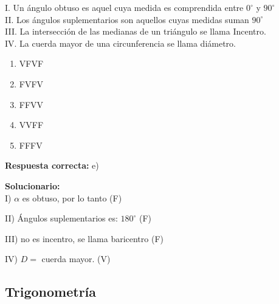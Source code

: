 \begin{enumerate}
	I. Un ángulo obtuso es aquel cuya medida es comprendida entre $0^\circ$ y $90^\circ$\\
	II. Los ángulos suplementarios son aquellos cuyas medidas suman $90^\circ$\\
	III. La intersección de las medianas de un triángulo se llama Incentro.\\
	IV. La cuerda mayor de una circunferencia se llama diámetro.
	
	\begin{enumerate}[label=\alph*)]
		\item VFVF
		\item FVFV
		\item FFVV
		\item VVFF
		\item FFFV
	\end{enumerate}
	\textbf{Respuesta correcta:} e)
	
	\vspace{2mm}
	\textbf{Solucionario:}\\
	
	I) $\alpha$ es obtuso, por lo tanto \hfill (F)
	
	II) Ángulos suplementarios es: $180^\circ$ \hfill (F)
	
	III) no es incentro, se llama baricentro \hfill (F)
	
	IV) $D=$ cuerda mayor. \hfill (V)
	
	\vspace{6mm}
	
\end{enumerate}




\subsection*{Trigonometría}

